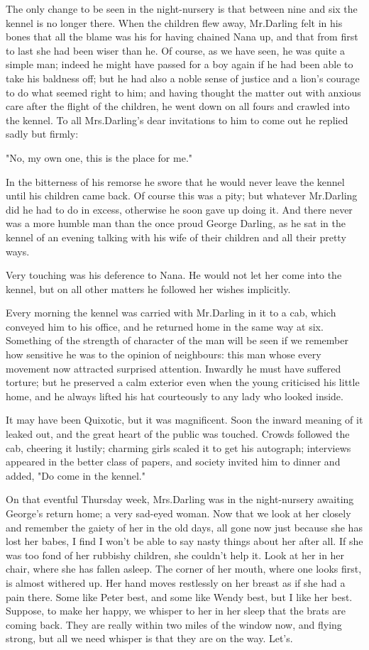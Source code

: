 The only change to be seen in the night-nursery is that between nine and six the kennel is no longer there.
When the children flew away, Mr.\@ Darling felt in his bones that all the blame was his for having chained Nana up, and that from first to last she had been wiser than he.
Of course, as we have seen, he was quite a simple man;
indeed he might have passed for a boy again if he had been able to take his baldness off;
but he had also a noble sense of justice and a lion's courage to do what seemed right to him;
and having thought the matter out with anxious care after the flight of the children, he went down on all fours and crawled into the kennel.
To all Mrs.\@ Darling's dear invitations to him to come out he replied sadly but firmly:

"No, my own one, this is the place for me."

In the bitterness of his remorse he swore that he would never leave the kennel until his children came back.
Of course this was a pity;
but whatever Mr.\@ Darling did he had to do in excess, otherwise he soon gave up doing it.
And there never was a more humble man than the once proud George Darling, as he sat in the kennel of an evening talking with his wife of their children and all their pretty ways.

Very touching was his deference to Nana.
He would not let her come into the kennel, but on all other matters he followed her wishes implicitly.

Every morning the kennel was carried with Mr.\@ Darling in it to a cab, which conveyed him to his office, and he returned home in the same way at six.
Something of the strength of character of the man will be seen if we remember how sensitive he was to the opinion of neighbours:
this man whose every movement now attracted surprised attention.
Inwardly he must have suffered torture;
but he preserved a calm exterior even when the young criticised his little home, and he always lifted his hat courteously to any lady who looked inside.

It may have been Quixotic, but it was magnificent.
Soon the inward meaning of it leaked out, and the great heart of the public was touched.
Crowds followed the cab, cheering it lustily;
charming girls scaled it to get his autograph;
interviews appeared in the better class of papers, and society invited him to dinner and added, "Do come in the kennel."

On that eventful Thursday week, Mrs.\@ Darling was in the night-nursery awaiting George's return home;
a very sad-eyed woman.
Now that we look at her closely and remember the gaiety of her in the old days, all gone now just because she has lost her babes, I find I won't be able to say nasty things about her after all.
If she was too fond of her rubbishy children, she couldn't help it.
Look at her in her chair, where she has fallen asleep.
The corner of her mouth, where one looks first, is almost withered up.
Her hand moves restlessly on her breast as if she had a pain there.
Some like Peter best, and some like Wendy best, but I like her best.
Suppose, to make her happy, we whisper to her in her sleep that the brats are coming back.
They are really within two miles of the window now, and flying strong, but all we need whisper is that they are on the way.
Let's.

